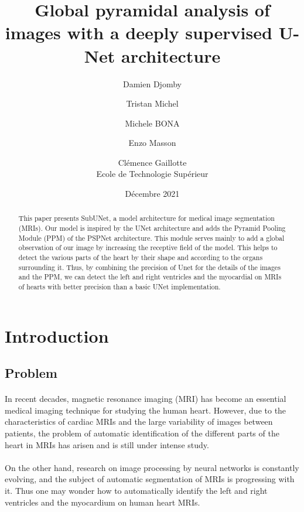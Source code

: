 \documentclass[english]{article}
\begin{document}

\title{Global pyramidal analysis of images with a deeply supervised U-Net architecture}

\author{
Damien Djomby \and Tristan Michel \and Michele BONA \and Enzo Masson \and Clémence Gaillotte \\
Ecole de Technologie Supérieur
}
\date{Décembre 2021}

\maketitle
\normalsize


\begin{abstract}
This paper presents SubUNet, a model architecture for medical image segmentation (MRIs). Our model is inspired by the UNet architecture and adds the Pyramid Pooling Module (PPM) of the PSPNet architecture. This module serves mainly to add a global observation of our image by increasing the receptive field of the model. This helps to detect the various parts of the heart by their shape and according to the organs surrounding it. Thus, by combining the precision of Unet for the details of the images and the PPM, we can detect the left and right ventricles and the myocardial on MRIs of hearts with better precision than a basic UNet implementation.
\end{abstract}


\section{Introduction}  

\subsection{Problem}
\paragraph{}
In recent decades, magnetic resonance imaging (MRI) has become an essential medical imaging technique for studying the human heart. However, due to the characteristics of cardiac MRIs and the large variability of images between patients, the problem of automatic identification of the different parts of the heart in MRIs has arisen and is still under intense study.
\paragraph{}
On the other hand, research on image processing by neural networks is constantly evolving, and the subject of automatic segmentation of MRIs is progressing with it. Thus one may wonder how to automatically identify the left and right ventricles and the myocardium on human heart MRIs.
\end{document}
